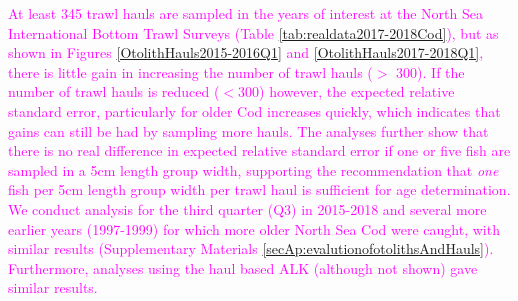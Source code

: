 \documentclass[a4paper 12pt]{article}
\numberwithin{equation}{section}
\newcommand{\natty}[1]{\textcolor{magenta}{#1}}
\begin{document}
\natty{At least 345 trawl hauls are sampled in the years of interest at the North Sea International Bottom Trawl Surveys (Table \ref{tab:realdata2017-2018Cod}), but as shown in Figures \ref{OtolithHauls2015-2016Q1} and  \ref{OtolithHauls2017-2018Q1}, there is little gain in increasing the number of trawl hauls ($>$ 300). If the number of trawl hauls is reduced ($< 300$) however, the expected relative standard error, particularly for older Cod increases quickly, which indicates that gains can still be had by sampling more hauls. The analyses further show that  there is no real difference in expected relative standard error if one or five fish are sampled in a 5cm length group width, supporting the recommendation that \textit{one} fish per 5cm length group width per trawl haul is sufficient for age determination. We conduct analysis for the third quarter (Q3) in 2015-2018 and several more earlier years (1997-1999) for which more older North Sea Cod were caught, with similar results (Supplementary Materials \ref{secAp:evalutionofotolithsAndHauls}). Furthermore, analyses using the haul based ALK (although not shown) gave similar results.}

 
\end{document}
